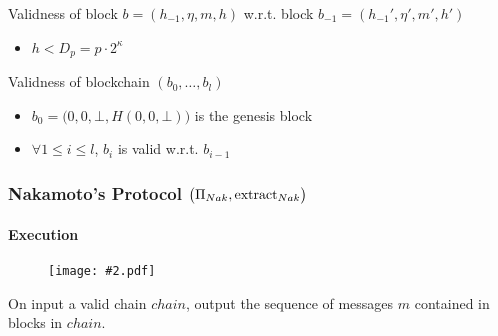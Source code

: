 \documentclass{beamer}
\newcommand{\insfig}[2][1]{
	\begin{figure}
		\texttt{[image: \#2.pdf]}
	\end{figure}
}
\newcommand{\nak}{\big(\Pi_{Nak}, {\rm extract}_{Nak}\big)}
\begin{document}
\begin{spacing}{1.2}
\begin{frame}
{\begin{block}{Validness of block $b = (h_{-1}, \eta, m, h)$ w.r.t. block $b_{-1} = (h_{-1}', \eta', m', h')$}
\begin{itemize}
			\item $h < D_p = p \cdot 2^{\kappa}$
		\end{itemize}
	\end{block}
	\vspace{10pt}
	\begin{block}{Validness of blockchain $(b_0, \dots, b_l)$}
		\begin{itemize}
			\item $b_0 = \big(0, 0, \bot, H(0, 0, \bot)\big)$ is the genesis block
			\item $\forall 1 \leq i \leq l$, $b_i$ is valid w.r.t. $b_{i-1}$
		\end{itemize}
	\end{block}
	}
\end{frame}

\begin{frame}
	\frametitle{Nakamoto's Protocol $\nak$}
	\framesubtitle{Execution}
	\vspace{-5pt}
	\begin{block}{}
		\insfig{NPE1}
	\end{block}
	\vspace{10pt}
	\begin{block}{}
		On input a valid chain $chain$, output the sequence of messages $m$ contained in blocks in $chain$.
	\end{block}
\end{frame}


\end{spacing}
\end{document}
